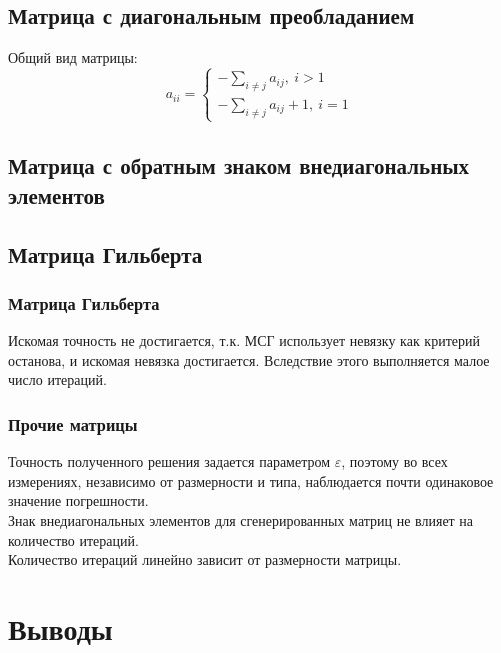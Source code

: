 \subsection{Матрица с диагональным преобладанием}
Общий вид матрицы:
\[a_{ii} =
	\begin{cases}
		-\sum_{i\neq j} a_{ij}, \ i > 1 \\
		-\sum_{i\neq j} a_{ij} + 1, \ i = 1
	\end{cases}\]


\subsection{Матрица с обратным знаком внедиагональных элементов}


\subsection{Матрица Гильберта}


\subsubsection*{Матрица Гильберта}

Искомая точность не достигается, т.к. МСГ использует невязку как критерий останова, и искомая невязка достигается. Вследствие этого выполняется малое число итераций.

\subsubsection*{Прочие матрицы}

Точность полученного решения задается параметром $\varepsilon$, поэтому во всех измерениях, независимо от размерности и типа, наблюдается почти одинаковое значение погрешности.\\
Знак внедиагональных элементов для сгенерированных матриц не влияет на количество итераций.\\
Количество итераций линейно зависит от размерности матрицы.

\newpage
\section{Выводы}


